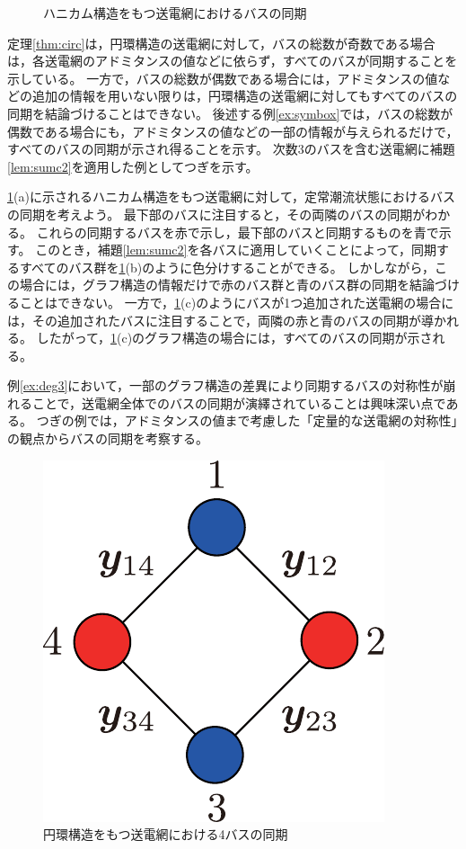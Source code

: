\documentclass[tombow,dvipdfmx]{corona-a5}
\begin{document}
\begin{figure}[t]
{\begin{minipage}{0.3\linewidth}
    \subcaption{  }
  \end{minipage}
  \caption{ハニカム構造をもつ送電網におけるバスの同期}
  \label{fig:hony}
  }
\end{figure}

定理\ref{thm:circ}は，円環構造の送電網に対して，バスの総数が奇数である場合は，各送電網のアドミタンスの値などに依らず，すべてのバスが同期することを示している。
一方で，バスの総数が偶数である場合には，アドミタンスの値などの追加の情報を用いない限りは，円環構造の送電網に対してもすべてのバスの同期を結論づけることはできない。
後述する例\ref{ex:symbox}では，バスの総数が偶数である場合にも，アドミタンスの値などの一部の情報が与えられるだけで，すべてのバスの同期が示され得ることを示す。
次数3のバスを含む送電網に補題\ref{lem:sumc2}を適用した例としてつぎを示す。

\begin{例}[ハニカム構造の送電網におけるバスの同期]\label{ex:deg3}
\ref{fig:hony}(a)に示されるハニカム構造をもつ送電網に対して，定常潮流状態におけるバスの同期を考えよう。
最下部のバスに注目すると，その両隣のバスの同期がわかる。
これらの同期するバスを赤で示し，最下部のバスと同期するものを青で示す。
このとき，補題\ref{lem:sumc2}を各バスに適用していくことによって，同期するすべてのバス群を\ref{fig:hony}(b)のように色分けすることができる。
しかしながら，この場合には，グラフ構造の情報だけで赤のバス群と青のバス群の同期を結論づけることはできない。
一方で，\ref{fig:hony}(c)のようにバスが1つ追加された送電網の場合には，その追加されたバスに注目することで，両隣の赤と青のバスの同期が導かれる。
したがって，\ref{fig:hony}(c)のグラフ構造の場合には，すべてのバスの同期が示される。
\end{例}

例\ref{ex:deg3}において，一部のグラフ構造の差異により同期するバスの対称性が崩れることで，送電網全体でのバスの同期が演繹されていることは興味深い点である。
つぎの例では，アドミタンスの値まで考慮した「定量的な送電網の対称性」の観点からバスの同期を考察する。

\begin{figure}[t]
\centering
\includegraphics[width = .18\linewidth]{figs/4busbox}
\caption{円環構造をもつ送電網における4バスの同期}
\label{fig:4busbox}
\end{figure}
\end{document}
